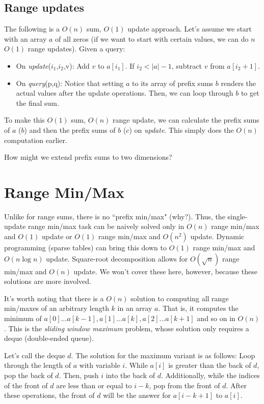 \documentclass{article}
\begin{document}
\subsection{Range updates}

The following is a $O(n)$ sum, $O(1)$ update approach.
Let's assume we start with an array $a$ of all zeros (if we want to start with certain values, we can do $n$ $O(1)$ range updates). Given a query:
\begin{itemize}
    \item On \textit{update}($i_1$,$i_2$,v): Add $v$ to $a[i_1]$. If $i_2 < |a|-1$, subtract $v$ from $a[i_2+1]$.
    \item On \textit{query}(p,q): Notice that setting $a$ to its array of prefix sums $b$ renders the actual values after the update operations. Then, we can loop through $b$ to get the final sum.
\end{itemize}

To make this $O(1)$ sum, $O(n)$ range update, we can calculate the prefix sums of $a$ ($b$) and then the prefix sums of $b$ ($c$) on \textit{update}. This simply does the $O(n)$ computation earlier.

How might we extend prefix sums to two dimensions?

\section{Range Min/Max}
Unlike for range sums, there is no ``prefix min/max" (why?). Thus, the single-update range min/max task can be naively solved only in $O(n)$ range min/max and $O(1)$ update or $O(1)$ range min/max and $O(n^2)$ update. Dynamic programming (sparse tables) can bring this down to $O(1)$ range min/max and $O(n \log n)$ update. Square-root decomposition allows for $O(\sqrt{n})$ range min/max and $O(n)$ update. We won't cover these here, however, because these solutions are more involved.

It's worth noting that there is a $O(n)$ solution to computing all range min/maxes of an arbitrary length $k$ in an array $a$. That is, it computes the minimum of $a[0]...a[k-1], a[1]...a[k], a[2]...a[k+1]$ and so on in $O(n)$. This is the \textit{sliding window maximum} problem, whose solution only requires a deque (double-ended queue).

Let's call the deque $d$. The solution for the maximum variant is as follows:
Loop through the length of $a$ with variable $i$. While $a[i]$ is greater than the back of $d$, pop the back of $d$. Then, push $i$ into the back of $d$. Additionally, while the indices of the front of $d$ are less than or equal to $i-k$, pop from the front of $d$. After these operations, the front of $d$ will be the answer for $a[i-k+1]$ to $a[i]$.
\end{document}

